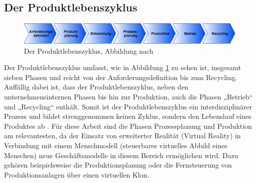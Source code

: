 \subsection{Der Produktlebenszyklus}\label{sec:Produktlebenszyklus}
\begin{figure}[h]
	\centering
	\includegraphics[width=1\linewidth]{Bilder/A8_Produktlebenszyklus}
	\caption{Der Produktlebenszyklus, Abbildung nach \cite[S.3]{13}}
	\label{fig:Produktlebenszyklus}
\end{figure}
\noindent Der Produktlebenszyklus umfasst, wie in Abbildung \ref{fig:Produktlebenszyklus} zu sehen ist, insgesamt sieben Phasen und reicht von der Anforderungsdefinition bis zum Recycling. Auffällig dabei ist, dass der Produktlebenszyklus, neben den unternehmensinternen Phasen bis hin zur Produktion, auch die Phasen „Betrieb“ und „Recycling“ enthält. Somit ist der Produktlebenszyklus ein interdisziplinärer Prozess und bildet strenggenommen keinen Zyklus, sondern den Lebenslauf eines Produktes ab \cite[S.3]{13}.
\newline
Für diese Arbeit sind die Phasen Prozessplanung und Produktion am relevantesten, da der Einsatz von erweiterter Realität (Virtual Reality) in Verbindung mit einem Menschmodell (steuerbares virtuelles Abbild eines Menschen) neue Geschäftsmodelle in diesem Bereich ermöglichen wird. Dazu gehören beispielsweise die Produktionsplanung oder die Fernsteuerung von Produktionsanlagen über einen virtuellen Klon.

